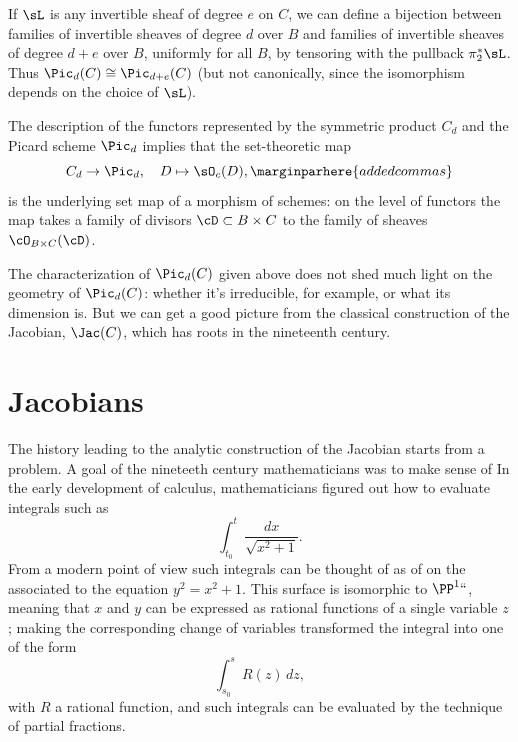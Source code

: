 If $\sL$ is any invertible sheaf of degree $e$ on $C$, we can define a
bijection between families of invertible sheaves of degree $d$ over
%
$B$ and families of invertible sheaves of degree $d+e$ over $B$,
uniformly for all $B$, by tensoring with the pullback $\pi_2^*\sL$.
Thus $\Pic_d(C) \cong \Pic_{d+e}(C)$ (but not canonically, since the
isomorphism depends on the choice of $\sL$).
 
The description of the functors represented by the symmetric product $C_d$ and the Picard scheme $\Pic_d$ implies that the 
set-theoretic map
$$
C_d \to \Pic_d, \quad D \mapsto \sO_c(D),
\marginparhere{added commas}
$$
is the underlying set map of a morphism of schemes: on the level of functors the map takes a family of divisors $\cD\subset B\times C$
to the family of sheaves $\cO_{B\times C}(\cD)$.

The characterization of $\Pic_d(C)$ 
given
above does not shed much light on the geometry of $\Pic_d(C)$: whether
it's irreducible, for example, or what its dimension is. But we can
get a  good picture from the classical construction of the Jacobian,
$\Jac(C)$, which has roots in the nineteenth century.
 
\section{Jacobians}

The history leading to the analytic construction of the Jacobian
%
starts from a 
%
%
problem. A goal of the nineteeth century
mathematicians was  to make sense of 
%
In the early development of calculus, mathematicians figured out how
to evaluate integrals such as
$$
\int_{t_0}^t \frac{dx}{\sqrt{x^2+1}}.
$$
From a modern point of view such integrals can be thought of as 
%
of 
%
on the 
%
associated to the equation $y^2 = x^2+1$. This surface is isomorphic
to $\PP^1` `$, meaning that $x$ and $y$ can be expressed as rational
functions of a single variable $z$; making the corresponding change of
variables transformed the integral into one of the form 
$$
\int_{s_0}^s R(z)\,dz,
$$
with $R$ a rational function, and such integrals can be evaluated by the technique of partial fractions.

